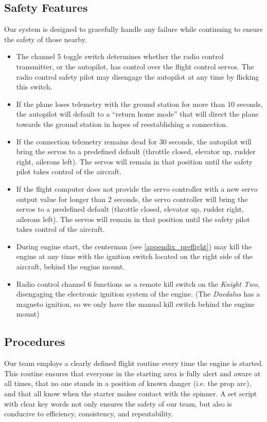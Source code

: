 \documentclass[pdftex,10pt,letter]{article}
\begin{document}
\subsection{Safety Features}
Our system is designed to gracefully handle any failure while continuing to ensure the safety of those nearby. 
\begin{itemize}
	\setlength{\itemsep}{0cm}
	\setlength{\parskip}{0cm}
	\item The channel 5 toggle switch determines whether the radio control transmitter, or the autopilot, has control over the flight control servos. The radio control safety pilot may disengage the autopilot at any time by flicking this switch.
	\item If the plane loses telemetry with the ground station for more than 10 seconds, the autopilot will default to a ``return home mode'' that will direct the plane towards the ground station in hopes of reestablishing a connection.  
	\item If the connection telemetry remains dead for 30 seconds, the autopilot will bring the servos to a predefined default (throttle closed, elevator up, rudder right, ailerons left). The servos will remain in that position until the safety pilot takes control of the aircraft.
	\item If the flight computer does not provide the servo controller with a new servo output value for longer than 2 seconds, the servo controller will bring the servos to a predefined default (throttle closed, elevator up, rudder right, ailerons left).  The servos will remain in that position until the safety pilot takes control of the aircraft.
	\item During engine start, the centerman (see \ref{appendix_preflight}) may kill the engine at any time with the ignition switch located on the right side of the aircraft, behind the engine mount.
	\item Radio control channel 6 functions as a remote kill switch on the \emph{Knight Two}, disengaging the electronic ignition system of the engine. (The \emph{Daedalus} has a magneto ignition, so we only have the manual kill switch behind the engine mount)
\end{itemize}

\subsection{Procedures}
Our team employs a clearly defined flight routine every time the engine is started.  This routine ensures that everyone in the starting area is fully alert and aware at all times, that no one stands in a position of known danger (i.e. the prop arc), and that all know when the starter makes contact with the spinner.  A set script with clear key words not only ensures the safety of our team, but also is conducive to efficiency, consistency, and repeatability.
\end{document}
